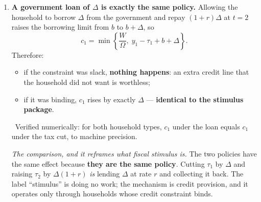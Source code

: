 \documentclass[12pt, letterpaper]{article}
\newcommand{\dd}[2]{\dfrac{d #1}{d #2}}
\begin{document}
\begin{tcolorbox}[oddbox,title={Problem 6.5 \quad Credit Constraints and Ricardian Equivalence}]
\begin{enumerate}
\begin{enumerate}[label=\textbf{(\roman*)},leftmargin=2.1em,itemsep=5pt,topsep=4pt]
\item \textbf{Constraint binding: $c_1$ rises one-for-one.} Now
      $c_1=y_1-\tau_1+b$, and $\tau_1$ has fallen by $\Delta$:
      \[
      \boxed{\dd{c_1}{\Delta}=1} .
      \]
      The marginal propensity to consume out of the stimulus is \textbf{one}. \checkmark\
      Numerically, with $\beta=0.96$, $\sigma=2$, $r=0.05$, $\Delta=0.2$: an unconstrained
      household's $c_1$ stays at $2.02046$; a constrained one's rises from $1.05$ to $1.25$,
      exactly $\Delta$.
\end{enumerate}

\smallskip
\emph{The explanation, and it is the point of the whole problem.} Ricardian equivalence is
not a claim about people being clever or far-sighted. It is a claim that the tax cut has
given the household nothing it did not already have: the ability to move a unit of resources
from period 2 to period 1 at the rate $1+r$. An unconstrained household could already do
that in the credit market, so the government's offer is redundant and is neutralised. A
constrained household could \emph{not} do it, and for that household the tax cut is not a
transfer of timing --- it is a \textbf{relaxation of a binding quantity constraint}, which
is why the whole thing is spent.

\item \textbf{A government loan of $\Delta$ is exactly the same policy.} Allowing the
household to borrow $\Delta$ from the government and repay $(1+r)\Delta$ at $t=2$ raises the
borrowing limit from $b$ to $b+\Delta$, so
\[
c_1=\min\left\{\frac{W}{\Omega},\;y_1-\tau_1+b+\Delta\right\} .
\]
Therefore:
\begin{itemize}[leftmargin=1.3em,itemsep=3pt,topsep=3pt]
\item if the constraint was slack, \textbf{nothing happens}: an extra credit line that the
      household did not want is worthless;
\item if it was binding, $c_1$ rises by exactly $\Delta$ --- \textbf{identical to the
      stimulus package}.
\end{itemize}
\checkmark\ Verified numerically: for both household types, $c_1$ under the loan equals
$c_1$ under the tax cut, to machine precision.

\smallskip
\emph{The comparison, and it reframes what fiscal stimulus is.} The two policies have the
same effect because \textbf{they are the same policy}. Cutting $\tau_1$ by $\Delta$ and
raising $\tau_2$ by $\Delta(1+r)$ \emph{is} lending $\Delta$ at rate $r$ and collecting it
back. The label ``stimulus'' is doing no work; the mechanism is credit provision, and it
operates only through households whose credit constraint binds.


\end{enumerate}
\end{tcolorbox}
\end{document}
